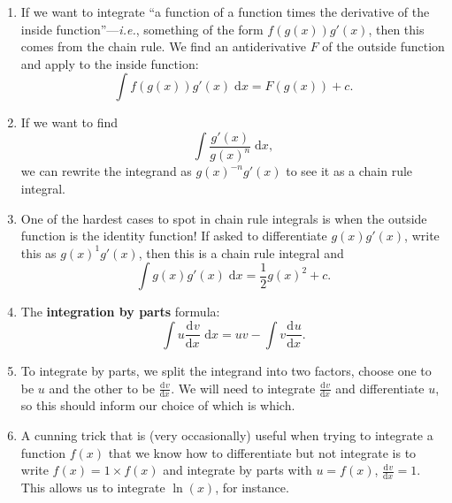 \documentclass{article}
\newcommand{\deriv}[3][]{\frac{\mathrm{d}^{#1}#2}{\mathrm{d}#3^{#1}}}
\newcommand{\diff}{\;\mathrm{d}}
\begin{document}
\begin{enumerate}
	\item If we want to integrate ``a function of a function times the derivative of the inside function''---\textit{i.e.}, something of the form $f(g(x))g'(x)$, then this comes from the chain rule. We find an antiderivative $F$ of the outside function and apply to the inside function:
		\[\int f(g(x))g'(x)\diff x = F(g(x))+c.\]
	\item If we want to find
		\[\int \frac{g'(x)}{g(x)^n}\diff x,\]
		we can rewrite the integrand as $g(x)^{-n}g'(x)$ to see it as a chain rule integral.
	\item One of the hardest cases to spot in chain rule integrals is when the outside function is the identity function! If asked to differentiate $g(x)g'(x)$, write this as $g(x)^1g'(x)$, then this is a chain rule integral and
		\[\int g(x)g'(x)\diff x = \frac{1}{2}g(x)^2+c.\]
	\item The \textbf{integration by parts} formula:
		\[\int u\deriv{v}{x}\diff x = uv - \int v\deriv{u}{x}.\]
	\item To integrate by parts, we split the integrand into two factors, choose one to be $u$ and the other to be $\deriv{v}{x}$. We will need to integrate $\deriv{v}{x}$ and differentiate $u$, so this should inform our choice of which is which.
	\item A cunning trick that is (very occasionally) useful when trying to integrate a function $f(x)$ that we know how to differentiate but not integrate is to write $f(x)=1\times f(x)$ and integrate by parts with $u=f(x)$, $\deriv{v}{x}=1$. This allows us to integrate $\ln(x)$, for instance.
\end{enumerate}
\end{document}
